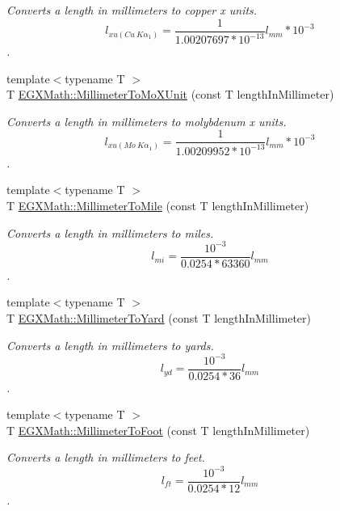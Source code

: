 \begin{DoxyCompactItemize}
\begin{DoxyCompactList}\small\item\em Converts a length in millimeters to copper x units. \[ l_{xu(Cu\ K\alpha_1)}= \frac{1}{1.00207697*10^{-13}} l_{mm} * 10^{-3}\]. \end{DoxyCompactList}\item 
{\footnotesize template$<$typename T $>$ }\\T \mbox{\hyperlink{group___e_g_x_math-_conversions-_length_conversions-_s_i-_millimeter-_non-_s_i_ga1f0be98bc702f46a69579b27e05a2439}{E\+G\+X\+Math\+::\+Millimeter\+To\+Mo\+X\+Unit}} (const T length\+In\+Millimeter)
\begin{DoxyCompactList}\small\item\em Converts a length in millimeters to molybdenum x units. \[ l_{xu(Mo\ K\alpha_1)}=\frac{1}{1.00209952*10^{-13}} l_{mm} * 10^{-3}\]. \end{DoxyCompactList}\item 
{\footnotesize template$<$typename T $>$ }\\T \mbox{\hyperlink{group___e_g_x_math-_conversions-_length_conversions-_s_i-_millimeter-_imperial_ga8a11dcd8f7866189b30e01d65e003e2d}{E\+G\+X\+Math\+::\+Millimeter\+To\+Mile}} (const T length\+In\+Millimeter)
\begin{DoxyCompactList}\small\item\em Converts a length in millimeters to miles. \[ l_{mi}=\frac{10^{-3}}{0.0254 * 63360} l_{mm} \]. \end{DoxyCompactList}\item 
{\footnotesize template$<$typename T $>$ }\\T \mbox{\hyperlink{group___e_g_x_math-_conversions-_length_conversions-_s_i-_millimeter-_imperial_gae1b144c2bc56f6591e0ee9b37f0653fa}{E\+G\+X\+Math\+::\+Millimeter\+To\+Yard}} (const T length\+In\+Millimeter)
\begin{DoxyCompactList}\small\item\em Converts a length in millimeters to yards. \[ l_{yd}= \frac{10^{-3}}{0.0254 * 36} l_{mm} \]. \end{DoxyCompactList}\item 
{\footnotesize template$<$typename T $>$ }\\T \mbox{\hyperlink{group___e_g_x_math-_conversions-_length_conversions-_s_i-_millimeter-_imperial_ga96513545d32f8e86044a3a3551840023}{E\+G\+X\+Math\+::\+Millimeter\+To\+Foot}} (const T length\+In\+Millimeter)
\begin{DoxyCompactList}\small\item\em Converts a length in millimeters to feet. \[ l_{ft}= \frac{10^{-3}}{0.0254 * 12} l_{mm} \]. \end{DoxyCompactList}\item 

\end{DoxyCompactItemize}
